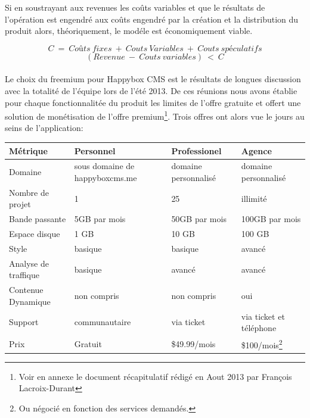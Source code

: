 \documentclass[11pt, a4paper ]{article}
\begin{document}
\begin{spacing}{1.5}
Si en soustrayant aux revenues les coûts variables et que le résultats de l'opération est engendré aux coûts engendré par la création et la distribution du produit alors, théoriquement, le modéle est économiquement viable.

\begin{equation}
	C\ =\ Coûts\ fixes\ +\ Couts\ Variables\ +\ Couts\ spéculatifs
\end{equation}
\begin{equation}
	(Revenue\ -\ Couts\ variables)\ <\ C
\end{equation}

\paragraph{} %
Le choix du freemium pour Happybox CMS est le résultats de longues discussion avec la totalité de l'équipe lors de l'été 2013. De ces réunions nous avons établie pour chaque fonctionnalitée du produit les limites de l'offre gratuite et offert une solution de monétisation de l'offre premium\footnote{Voir en annexe le document récapitulatif rédigé en Aout 2013 par François Lacroix-Durant}.
Trois offres ont alors vue le jours au seins de l'application:

\begin{center}
	\begin{tabular}{|l|l|l|l|}
		Métrique & Personnel & Professionel & Agence \\
		\hline
		Domaine & sous domaine de happyboxcms.me & domaine personnalisé & domaine personnalisé \\
		Nombre de projet & 1 & 25 & illimité \\
		Bande passante & 5GB par mois & 50GB par mois & 100GB par mois \\
		Espace disque & 1 GB & 10 GB & 100 GB \\
		Style & basique & basique & avancé \\
		Analyse de traffique & basique & avancé & avancé \\
		Contenue Dynamique & non compris & non compris & oui \\
		Support & communautaire & via ticket & via ticket et téléphone  \\
		Prix & Gratuit & \$49.99/mois & \$100/mois\footnote{Ou négocié en fonction des services demandés.} \\


\end{tabular}
\end{center}
\end{spacing}
\end{document}

